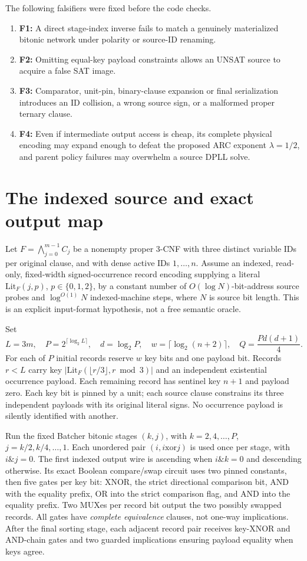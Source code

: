 \documentclass[11pt]{article}
\begin{document}
\noindent The following falsifiers were fixed before the code checks.
\begin{enumerate}
\item[] \textbf{F1:} A direct stage-index inverse fails to match a genuinely
materialized bitonic network under polarity or source-ID renaming.
\item[] \textbf{F2:} Omitting equal-key payload constraints allows an UNSAT
source to acquire a false SAT image.
\item[] \textbf{F3:} Comparator, unit-pin, binary-clause expansion or final
serialization introduces an ID collision, a wrong source sign, or a malformed
proper ternary clause.
\item[] \textbf{F4:} Even if intermediate output access is cheap, its complete
physical encoding may expand enough to defeat the proposed ARC exponent
$\lambda=1/2$, and parent policy failures may overwhelm a source DPLL solve.
\end{enumerate}

\section{The indexed source and exact output map}
Let $F=\bigwedge_{j=0}^{m-1}C_j$ be a nonempty proper 3-CNF with three
distinct variable IDs per original clause, and with dense active IDs
$1,\ldots,n$. Assume an indexed, read-only, fixed-width signed-occurrence
record encoding supplying a literal $\mathrm{Lit}_F(j,p)$, $p\in\{0,1,2\}$,
by a constant number of $O(\log N)$-bit-address source probes and
$\log^{O(1)}N$ indexed-machine steps, where $N$ is source bit length.
This is an explicit input-format hypothesis, not a free semantic oracle.

Set
\[
 L=3m,\quad P=2^{\lceil\log_2L\rceil},\quad
 d=\log_2P,\quad w=\lceil\log_2(n+2)\rceil,\quad
 Q=\frac{P d(d+1)}4.
\]
For each of $P$ initial records reserve $w$ key bits and one payload bit.
Records $r<L$ carry key $|\mathrm{Lit}_F(\lfloor r/3\rfloor,r\bmod3)|$
and an independent existential occurrence payload. Each remaining record has
sentinel key $n+1$ and payload zero. Each key bit is pinned by a unit; each
source clause constrains its three independent payloads with its original
literal signs. No occurrence payload is silently identified with another.

Run the fixed Batcher bitonic stages $(k,j)$, with
$k=2,4,\ldots,P$, $j=k/2,k/4,\ldots,1$. Each unordered pair
$(i,i\mathbin{\mathrm{xor}}j)$ is used once per stage, with $i\&j=0$.
The first indexed output wire is ascending when $i\&k=0$ and descending
otherwise. Its exact Boolean compare/swap circuit uses two pinned constants,
then five gates per key bit: XNOR, the strict directional comparison bit,
AND with the equality prefix, OR into the strict comparison flag, and
AND into the equality prefix. Two MUXes per record bit output the two
possibly swapped records. All gates have \emph{complete equivalence}
clauses, not one-way implications. After the final sorting stage, each
adjacent record pair receives key-XNOR and AND-chain gates and two guarded
implications ensuring payload equality when keys agree.
\end{document}

